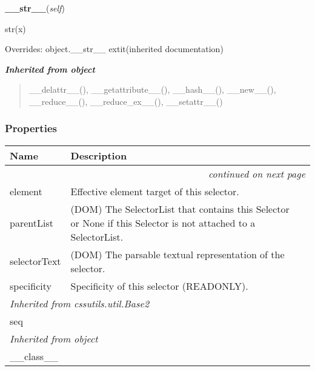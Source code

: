     \vspace{0.5ex}

\hspace{.8\funcindent}\begin{boxedminipage}{\funcwidth}

    \raggedright \textbf{\_\_str\_\_}(\textit{self})

\setlength{\parskip}{2ex}
    str(x)

\setlength{\parskip}{1ex}
      Overrides: object.\_\_str\_\_ 	extit{(inherited documentation)}

    \end{boxedminipage}


\large{\textbf{\textit{Inherited from object}}}

\begin{quote}
\_\_delattr\_\_(), \_\_getattribute\_\_(), \_\_hash\_\_(), \_\_new\_\_(), \_\_reduce\_\_(), \_\_reduce\_ex\_\_(), \_\_setattr\_\_()
\end{quote}


  \subsubsection{Properties}

    \vspace{-1cm}
\hspace{\varindent}\begin{longtable}{|p{\varnamewidth}|p{\vardescrwidth}|l}
\cline{1-2}
\cline{1-2} \centering \textbf{Name} & \centering \textbf{Description}& \\
\cline{1-2}
\endhead\cline{1-2}\multicolumn{3}{r}{\small\textit{continued on next page}}\\\endfoot\cline{1-2}
\endlastfoot\raggedright e\-l\-e\-m\-e\-n\-t\- & \raggedright Effective element target of this selector.&\\
\cline{1-2}
\raggedright p\-a\-r\-e\-n\-t\-L\-i\-s\-t\- & \raggedright (DOM) The SelectorList that contains this Selector or        None if this Selector is not attached to a SelectorList.&\\
\cline{1-2}
\raggedright s\-e\-l\-e\-c\-t\-o\-r\-T\-e\-x\-t\- & \raggedright (DOM) The parsable textual representation of the selector.&\\
\cline{1-2}
\raggedright s\-p\-e\-c\-i\-f\-i\-c\-i\-t\-y\- & \raggedright Specificity of this selector (READONLY).&\\
\cline{1-2}
\multicolumn{2}{|l|}{\textit{Inherited from cssutils.util.Base2}}\\
\multicolumn{2}{|p{\varwidth}|}{\raggedright seq}\\
\cline{1-2}
\multicolumn{2}{|l|}{\textit{Inherited from object}}\\
\multicolumn{2}{|p{\varwidth}|}{\raggedright \_\_class\_\_}\\
\cline{1-2}
\end{longtable}

